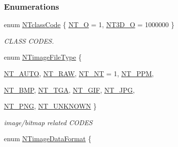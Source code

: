\subsubsection*{Enumerations}
\begin{DoxyCompactItemize}
\item 
enum \hyperlink{nt__codes_8h_a35d76103d11ffeef76a733d42bce9242}{NTclassCode} \{ \hyperlink{nt__codes_8h_a35d76103d11ffeef76a733d42bce9242ab8b2418885bf0fbcd60197fb8d433482}{NT\_\-O} =  1, 
\hyperlink{nt__codes_8h_a35d76103d11ffeef76a733d42bce9242aecc7a6d371404152048cf01ecb030f34}{NT3D\_\-O} =  1000000
 \}
\begin{DoxyCompactList}\small\item\em CLASS CODES. \item\end{DoxyCompactList}\item 
enum \hyperlink{nt__codes_8h_a231ce3e06dce0c0308bfa7c58c1bbcb6}{NTimageFileType} \{ \par
\hyperlink{nt__codes_8h_a231ce3e06dce0c0308bfa7c58c1bbcb6a251eb02fcaa595be7a81b13ab481f666}{NT\_\-AUTO}, 
\hyperlink{nt__codes_8h_a231ce3e06dce0c0308bfa7c58c1bbcb6ab3bf869d18f2802187becc73a534e2a2}{NT\_\-RAW}, 
\hyperlink{nt__codes_8h_a231ce3e06dce0c0308bfa7c58c1bbcb6a457afcee46105038c2a8d16c89d8d892}{NT\_\-NT} = 1, 
\hyperlink{nt__codes_8h_a231ce3e06dce0c0308bfa7c58c1bbcb6a1041488ec3bc4bd597140dd0275b558f}{NT\_\-PPM}, 
\par
\hyperlink{nt__codes_8h_a231ce3e06dce0c0308bfa7c58c1bbcb6a05d48167a78ce10aa22c5c0e4fcfffd0}{NT\_\-BMP}, 
\hyperlink{nt__codes_8h_a231ce3e06dce0c0308bfa7c58c1bbcb6aa7dab7f6e2385170966452005cdba3c4}{NT\_\-TGA}, 
\hyperlink{nt__codes_8h_a231ce3e06dce0c0308bfa7c58c1bbcb6ac0cf674de022171d8744959e4c866792}{NT\_\-GIF}, 
\hyperlink{nt__codes_8h_a231ce3e06dce0c0308bfa7c58c1bbcb6ada81091a12e81db68b5c4e9b18ceab0f}{NT\_\-JPG}, 
\par
\hyperlink{nt__codes_8h_a231ce3e06dce0c0308bfa7c58c1bbcb6af2924760fcbe6530befab844f785be9f}{NT\_\-PNG}, 
\hyperlink{nt__codes_8h_a231ce3e06dce0c0308bfa7c58c1bbcb6a2678b7299019fe62e05a200e30aba894}{NT\_\-UNKNOWN}
 \}
\begin{DoxyCompactList}\small\item\em image/bitmap related CODES \item\end{DoxyCompactList}\item 
enum \hyperlink{nt__codes_8h_ad1bb9d54b61901f8e764e6cf0694e52f}{NTimageDataFormat} \{ \par

\end{DoxyCompactItemize}
